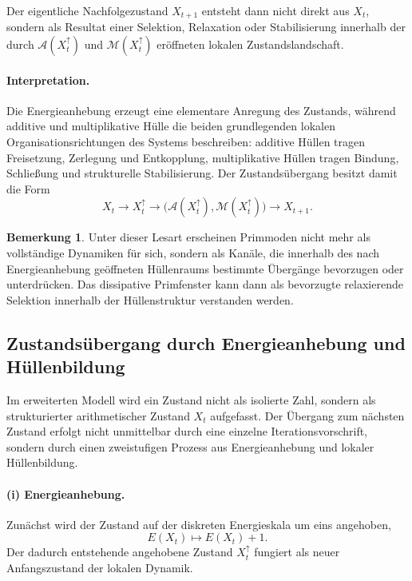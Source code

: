 \documentclass[11pt,a4paper]{article}
\theoremstyle{definition}
\newtheorem{bemerkung}{Bemerkung}
\begin{document}
Der eigentliche Nachfolgezustand \(X_{t+1}\) entsteht dann nicht direkt aus \(X_t\), sondern als Resultat einer Selektion, Relaxation oder Stabilisierung innerhalb der durch \(\mathcal{A}(X_t^\uparrow)\) und \(\mathcal{M}(X_t^\uparrow)\) eröffneten lokalen Zustandslandschaft.

\paragraph{Interpretation.}
Die Energieanhebung erzeugt eine elementare Anregung des Zustands, während additive und multiplikative Hülle die beiden grundlegenden lokalen Organisationsrichtungen des Systems beschreiben: additive Hüllen tragen Freisetzung, Zerlegung und Entkopplung, multiplikative Hüllen tragen Bindung, Schließung und strukturelle Stabilisierung. Der Zustandsübergang besitzt damit die Form
\[
X_t \longrightarrow X_t^\uparrow \longrightarrow \bigl(\mathcal{A}(X_t^\uparrow),\mathcal{M}(X_t^\uparrow)\bigr) \longrightarrow X_{t+1}.
\]
\begin{bemerkung}
	Unter dieser Lesart erscheinen Primmoden nicht mehr als vollständige Dynamiken für sich, sondern als Kanäle, die innerhalb des nach Energieanhebung geöffneten Hüllenraums bestimmte Übergänge bevorzugen oder unterdrücken. Das dissipative Primfenster kann dann als bevorzugte relaxierende Selektion innerhalb der Hüllenstruktur verstanden werden.
\end{bemerkung}
\subsection{Zustandsübergang durch Energieanhebung und Hüllenbildung}

Im erweiterten Modell wird ein Zustand nicht als isolierte Zahl, sondern als strukturierter arithmetischer Zustand \(X_t\) aufgefasst. Der Übergang zum nächsten Zustand erfolgt nicht unmittelbar durch eine einzelne Iterationsvorschrift, sondern durch einen zweistufigen Prozess aus Energieanhebung und lokaler Hüllenbildung.

\paragraph{(i) Energieanhebung.}
Zunächst wird der Zustand auf der diskreten Energieskala um eins angehoben,
\[
E(X_t)\mapsto E(X_t)+1.
\]
Der dadurch entstehende angehobene Zustand \(X_t^\uparrow\) fungiert als neuer Anfangszustand der lokalen Dynamik.
\end{document}
